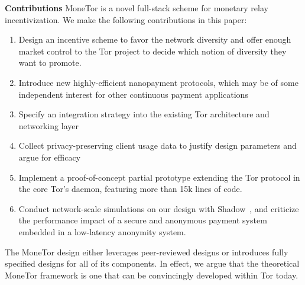 \textbf{Contributions} MoneTor is a novel full-stack scheme for monetary relay
incentivization. We make the following contributions in this paper:

\begin{enumerate}
\item Design an incentive scheme to favor the network diversity and offer enough market control to the Tor project to decide which notion of diversity they want to promote.
\item Introduce new highly-efficient nanopayment protocols, which may be of some
  independent interest for other continuous payment applications
\item Specify an integration strategy into the existing Tor architecture and networking layer
\item Collect privacy-preserving client usage data to justify design parameters
  and argue for efficacy
\item Implement a proof-of-concept partial prototype extending the Tor protocol in the core Tor's daemon, featuring more than 15k lines of code.
\item Conduct network-scale simulations on our design with Shadow~\cite{jansen2011shadow}, and criticize the performance impact of a secure and anonymous payment system embedded in a low-latency anonymity system.
\end{enumerate}

The MoneTor design either leverages peer-reviewed designs or introduces fully
specified designs for all of its components. In effect, we argue that the
theoretical MoneTor framework is one that can be convincingly developed within
Tor today.